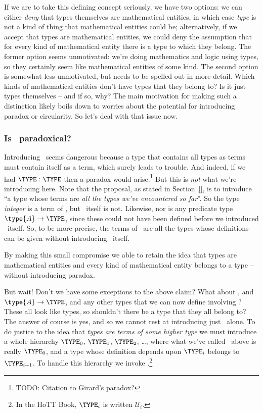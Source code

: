 If we are to take this defining concept seriously, we have two options:
we can either \emph{deny} that types themselves are mathematical entities, in which case \emph{type} is not a kind of thing that mathematical entities could be; alternatively, if we accept that types are mathematical entities, we could deny the assumption that for every kind of mathematical entity there is a type to which they belong.
The former option seems unmotivated: we're doing mathematics and logic using types, so they certainly seem like mathematical entities of some kind.  The second option is somewhat less unmotivated, but needs to be spelled out in more detail.  Which kinds of mathematical entities don't have types that they belong to?  Is it just types themselves -- and if so, why?  The main motivation for making such a distinction likely boils down to worries about the potential for introducing paradox or circularity.  So let's deal with that issue now.



\subsubsection{Is \TYPE\ paradoxical?}
\label{sec:Quantifiers-IsTYPEParadoxical}

Introducing \TYPE\ seems dangerous because a type that contains all types as terms must contain itself as a term, which surely leads to trouble.  And indeed, if we had $\TYPE:\TYPE$ then a paradox would arise.\footnote{
TODO: Citation to Girard's paradox?
}
But this is \emph{not} what we're introducing here.	 Note that the proposal, as stated in Section~\ref{}, is to introduce ``a type whose terms are \emph{all the types we've encountered so far}''.  So the type \emph{integer} is a term of \TYPE, but \TYPE\ itself is not.  Likewise, nor is any predicate type $\type{A} \to \TYPE$, since these could not have been defined before we introduced \TYPE\ itself.  So, to be more precise, the terms of \TYPE\ are all the types whose definitions can be given without introducing \TYPE\ itself.

By making this small compromise we able to retain the idea that types are mathematical entities and every kind of mathematical entity belongs to a type -- without introducing paradox.

But wait!  Don't we have some exceptions to the above claim?  What about \TYPE, and $\type{A} \to \TYPE$, and any other types that we can now define involving \TYPE?  These all look like types, so shouldn't there be a type that they all belong to?  The answer of course is yes, and so we cannot rest at introducing just \TYPE\ alone.  To do justice to the idea that \emph{types are terms of some higher type} we must introduce a whole hierarchy $\TYPE_0$, $\TYPE_1$, $\TYPE_2$, \ldots, where what we've called \TYPE\ above is really $\TYPE_0$, and a type whose definition depends upon $\TYPE_i$ belongs to $\TYPE_{i+1}$.  To handle this hierarchy we invoke .\footnote{In the HoTT Book, $\TYPE_i$ is written $\mathcal{U}_i$.
}

